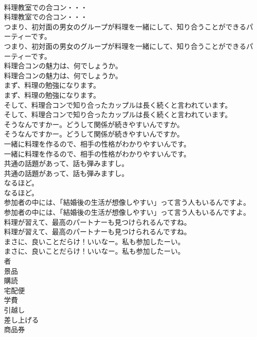 \documentclass[8pt]{extreport}
\begin{document}
\begin{CJK}{UTF8}{min}
\\	料理教室での合コン・・・	
\\	料理教室での合コン・・・ 
\\	つまり、初対面の男女のグループが料理を一緒にして、知り合うことができるパーティーです。	
\\	つまり、初対面の男女のグループが料理を一緒にして、知り合うことができるパーティーです。 
\\	料理合コンの魅力は、何でしょうか。	
\\	料理合コンの魅力は、何でしょうか。 
\\	まず、料理の勉強になります。	
\\	まず、料理の勉強になります。 
\\	そして、料理合コンで知り合ったカップルは長く続くと言われています。	
\\	そして、料理合コンで知り合ったカップルは長く続くと言われています。 
\\	そうなんですかー。どうして関係が続きやすいんですか。	
\\	そうなんですかー。どうして関係が続きやすいんですか。 
\\	一緒に料理を作るので、相手の性格がわかりやすいんです。	
\\	一緒に料理を作るので、相手の性格がわかりやすいんです。 
\\	共通の話題があって、話も弾みますし。	
\\	共通の話題があって、話も弾みますし。 
\\	なるほど。	
\\	なるほど。 
\\	参加者の中には、「結婚後の生活が想像しやすい」って言う人もいるんですよ。	
\\	参加者の中には、「結婚後の生活が想像しやすい」って言う人もいるんですよ。 
\\	料理が習えて、最高のパートナーも見つけられるんですね。	
\\	料理が習えて、最高のパートナーも見つけられるんですね。 
\\	まさに、良いことだらけ！いいなー。私も参加したーい。	
\\	まさに、良いことだらけ！いいなー。私も参加したーい。 
\\	者
\\	景品
\\	購読
\\	宅配便
\\	学費
\\	引越し
\\	差し上げる
\\	商品券

\end{CJK}
\end{document}
